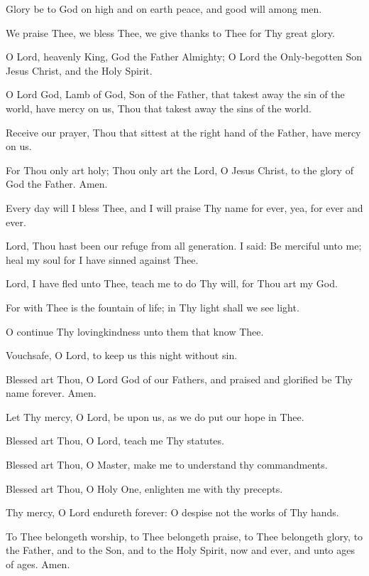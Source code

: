 Glory be to God on high and on earth peace, and good will among men.

We praise Thee, we bless Thee, we give thanks to Thee for Thy great glory.

O Lord, heavenly King, God the Father Almighty; O Lord the Only-begotten Son Jesus Christ, and the Holy Spirit.

O Lord God, Lamb of God, Son of the Father, that takest away the sin of the world, have mercy on us, Thou that takest away the sins of the world.

Receive our prayer, Thou that sittest at the right hand of the Father, have mercy on us.

For Thou only art holy; Thou only art the Lord, O Jesus Christ, to the glory of God the Father. Amen.

Every day will I bless Thee, and I will praise Thy name for ever, yea, for ever and ever.

Lord, Thou hast been our refuge from all generation. I said: Be merciful unto me; heal my soul for I have sinned against Thee.

Lord, I have fled unto Thee, teach me to do Thy will, for Thou art my God.

For with Thee is the fountain of life; in Thy light shall we see light.

O continue Thy lovingkindness unto them that know Thee.

Vouchsafe, O Lord, to keep us this night without sin.

Blessed art Thou, O Lord God of our Fathers, and praised and glorified be Thy name forever. Amen.

Let Thy mercy, O Lord, be upon us, as we do put our hope in Thee.

Blessed art Thou, O Lord, teach me Thy statutes.

Blessed art Thou, O Master, make me to understand thy commandments.

Blessed art Thou, O Holy One, enlighten me with thy precepts.

Thy mercy, O Lord endureth forever: O despise not the works of Thy hands.

To Thee belongeth worship, to Thee belongeth praise, to Thee belongeth glory, to the Father, and to the Son, and to the Holy Spirit, now and ever, and unto ages of ages. Amen.
